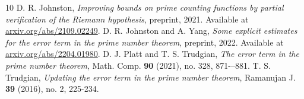 \documentclass[a4paper,12pt]{amsart}
\theoremstyle{definition}
\theoremstyle{remark}
\begin{document}
\begin{thebibliography}{10}
 D. R. Johnston, \textit{Improving bounds on prime counting functions by partial verification of the Riemann hypothesis}, preprint, 2021. Available at \url{arxiv.org/abs/2109.02249}.
 D. R. Johnston and A. Yang, \textit{Some explicit estimates for the error term in the prime number theorem}, preprint, 2022. Available at \url{arxiv.org/abs/2204.01980}.
 D. J. Platt and T. S. Trudgian, \textit{The error term in the prime number theorem}, Math. Comp. \textbf{90} (2021), no. 328, 871-–881.
 T. S. Trudgian, \textit{Updating the error term in the prime number theorem}, Ramanujan J. {\bf 39} (2016), no. 2, 225-234.
\end{thebibliography}
\end{document}
